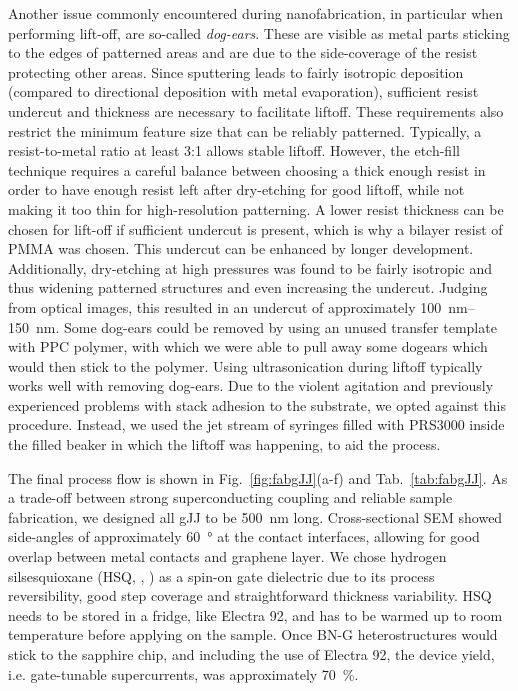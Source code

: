 Another issue commonly encountered during nanofabrication, in particular when performing lift-off, are so-called \textit{dog-ears}.
%
These are visible as metal parts sticking to the edges of patterned areas and are due to the side-coverage of the resist protecting other areas.
%
Since sputtering leads to fairly isotropic deposition (compared to directional deposition with metal evaporation), sufficient resist undercut and thickness are necessary to facilitate liftoff.
%
These requirements also restrict the minimum feature size that can be reliably patterned.
%
Typically, a resist-to-metal ratio at least 3:1 allows stable liftoff.
%
However, the etch-fill technique requires a careful balance between choosing a thick enough resist in order to have enough resist left after dry-etching for good liftoff, while not making it too thin for high-resolution patterning.
%
A lower resist thickness can be chosen for lift-off if sufficient undercut is present, which is why a bilayer resist of PMMA was chosen.
%
This undercut can be enhanced by longer development.
%
Additionally, dry-etching at high pressures was found to be fairly isotropic and thus widening patterned structures and even increasing the undercut.
%
Judging from optical images, this resulted in an undercut of approximately \SIrange{100}{150}{\nano\meter}.
%
Some dog-ears could be removed by using an unused transfer template with PPC polymer, with which we were able to pull away some dogears which would then stick to the polymer.
%
Using ultrasonication during liftoff typically works well with removing dog-ears.
%
Due to the violent agitation and previously experienced problems with stack adhesion to the substrate, we opted against this procedure.
%
Instead, we used the jet stream of syringes filled with PRS3000 inside the filled beaker in which the liftoff was happening, to aid the process.


The final process flow is shown in Fig.~\ref{fig:fabgJJ}(a-f) and Tab.~\ref{tab:fabgJJ}.
%
As a trade-off between strong superconducting coupling and reliable sample fabrication, we designed all gJJ to be \SI{500}{\nano\meter} long.
%
Cross-sectional SEM showed side-angles of approximately \SI{60}{\degree} at the contact interfaces, allowing for good overlap between metal contacts and graphene layer.
%
We chose hydrogen silsesquioxane (HSQ, , \cite{namatsuThreedimensionalSiloxaneResist1998}) as a spin-on gate dielectric due to its process reversibility, good step coverage and straightforward thickness variability.
%
HSQ needs to be stored in a fridge, like Electra 92, and has to be warmed up to room temperature before applying on the sample.
%
Once BN-G heterostructures would stick to the sapphire chip, and including the use of Electra 92, the device yield, i.e. gate-tunable supercurrents, was approximately \SI{70}{\percent}.



